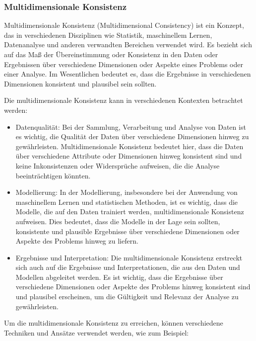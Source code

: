 \documentclass[../vs-script-first-v01.tex]{subfiles}
\begin{document}
\subsubsection{Multidimensionale Konsistenz }

Multidimensionale Konsistenz (Multidimensional Consistency) ist ein Konzept, das in verschiedenen Disziplinen wie Statistik, maschinellem Lernen, Datenanalyse und anderen verwandten Bereichen verwendet wird. Es bezieht sich auf das Maß der Übereinstimmung oder Konsistenz in den Daten oder Ergebnissen über verschiedene Dimensionen oder Aspekte eines Problems oder einer Analyse. Im Wesentlichen bedeutet es, dass die Ergebnisse in verschiedenen Dimensionen konsistent und plausibel sein sollten.

Die multidimensionale Konsistenz kann in verschiedenen Kontexten betrachtet werden:
\begin{itemize}
\item Datenqualität: Bei der Sammlung, Verarbeitung und Analyse von Daten ist es wichtig, die Qualität der Daten über verschiedene Dimensionen hinweg zu gewährleisten. Multidimensionale Konsistenz bedeutet hier, dass die Daten über verschiedene Attribute oder Dimensionen hinweg konsistent sind und keine Inkonsistenzen oder Widersprüche aufweisen, die die Analyse beeinträchtigen könnten.

\item Modellierung: In der Modellierung, insbesondere bei der Anwendung von maschinellem Lernen und statistischen Methoden, ist es wichtig, dass die Modelle, die auf den Daten trainiert werden, multidimensionale Konsistenz aufweisen. Dies bedeutet, dass die Modelle in der Lage sein sollten, konsistente und plausible Ergebnisse über verschiedene Dimensionen oder Aspekte des Problems hinweg zu liefern.

\item Ergebnisse und Interpretation: Die multidimensionale Konsistenz erstreckt sich auch auf die Ergebnisse und Interpretationen, die aus den Daten und Modellen abgeleitet werden. Es ist wichtig, dass die Ergebnisse über verschiedene Dimensionen oder Aspekte des Problems hinweg konsistent sind und plausibel erscheinen, um die Gültigkeit und Relevanz der Analyse zu gewährleisten.
\end{itemize}
Um die multidimensionale Konsistenz zu erreichen, können verschiedene Techniken und Ansätze verwendet werden, wie zum Beispiel:
\end{document}
